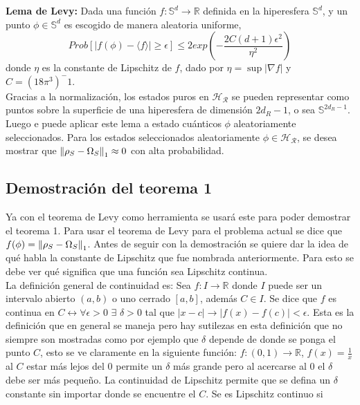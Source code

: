 \textbf{Lema de Levy:} Dada una función $f: \mathbb{S}^d \to \mathbb{R} $ definida en la hiperesfera $\mathbb{S}^d$, y un punto $\phi \in \mathbb{S}^d $ es escogido de manera aleatoria uniforme, 
\begin{equation}
Prob[|f(\phi)- \langle f \rangle| \ge \epsilon ] \le 2exp(-\frac{2C(d+1)\epsilon^2}{\eta^2})
\end{equation}
donde $\eta$ es la constante de Lipschitz de $f$, dado por $\eta= \sup|\nabla f|$ y $C=(18\pi^3)^-1$.\\

Gracias a la normalización, los estados puros en $\mathcal{H_{R}}$ se pueden representar como puntos sobre la superficie de una hiperesfera de dimensión $2d_{R}-1$, o sea  $\mathbb{S}^{2d_{R}-1}$. Luego e puede aplicar este lema a estado cuánticos $\phi$ aleatoriamente seleccionados. Para los estados seleccionados aleatoriamente $\phi \in \mathcal{H_{R}}$, se desea mostrar que $\norm{\rho_{S}- \Omega_{S}}_{1} \approx 0$ con alta probabilidad.\\

\subsection{Demostración del teorema 1}
Ya con el teorema de Levy como herramienta se usará este para poder demostrar el teorema 1. Para usar el teorema de Levy para el problema actual se dice que $f(\phi)= \norm{\rho_{S} - \Omega_{S}}_{1}$. Antes de seguir con la demostración se quiere dar la idea de qué habla la constante de Lipschitz que fue nombrada anteriormente. Para esto se debe ver qué significa que una función sea Lipschitz continua. \\
La definición general de continuidad es: Sea $f: I \to \mathbb{R}$ donde $I$ puede ser un intervalo abierto $(a,b)$ o uno cerrado $[a,b]$, además $C \in I$. Se dice que $f$ es continua en $C \longleftrightarrow \forall \epsilon >0 $ $\exists$ $ \delta >0 $ tal que  $ |x-c|\longrightarrow |f(x)-f(c)|< \epsilon $. Esta es la definición que en general se maneja pero hay sutilezas en esta definición que no siempre son mostradas como por ejemplo que $\delta$ depende de donde se ponga el  punto $C$, esto se ve claramente en la siguiente función: $f: (0,1) \to \mathbb{R}$, $f(x)=\frac{1}{x} $ al $C$ estar más lejos del $0$ permite un $\delta$ más grande pero al acercarse al $0$ el $\delta$ debe ser más pequeño.
La continuidad de Lipschitz permite que se defina un $\delta$ constante sin importar donde se encuentre el $C$. Se es Lipschitz continuo si 

